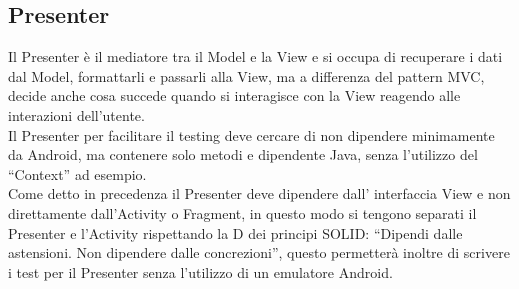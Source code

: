    \subsection{Presenter}
   Il Presenter è il mediatore tra il Model e la View e si occupa di  recuperare i dati dal Model, formattarli e passarli alla View, ma a differenza del pattern MVC, decide anche cosa succede quando si interagisce con la View reagendo alle interazioni dell'utente.\\
   Il Presenter per facilitare il testing deve cercare di non dipendere minimamente da Android, ma contenere solo metodi e dipendente Java, senza l'utilizzo del ``Context'' ad esempio.\\
   Come detto in precedenza il Presenter deve dipendere dall' interfaccia View e non direttamente dall'Activity o Fragment, in questo modo si tengono separati il Presenter e l'Activity rispettando la D dei principi SOLID: ``Dipendi dalle astensioni. Non dipendere dalle concrezioni'', questo permetterà inoltre di scrivere i test per il Presenter senza l'utilizzo di un emulatore Android.










\clearpage{\pagestyle{empty}\cleardoublepage}
